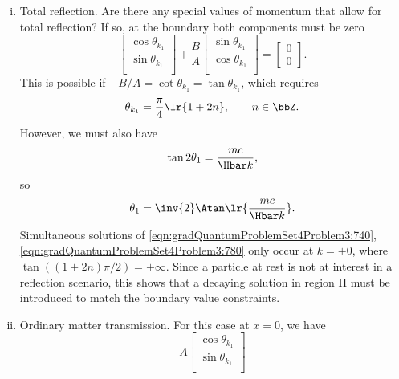 \begin{enumerate}[(i)]
\item Total reflection.  Are there any special values of momentum that allow for total reflection?  If so, at the boundary both components must be zero
%
\begin{equation}\label{eqn:gradQuantumProblemSet4Problem3:720}
\begin{bmatrix}
\cos\theta_{k_1} \\
\sin\theta_{k_1} \\
\end{bmatrix}
+
\frac{B}{A}
\begin{bmatrix}
\sin\theta_{k_1} \\
\cos\theta_{k_1} \\
\end{bmatrix}
=
\begin{bmatrix}
0 \\
0
\end{bmatrix}.
\end{equation}
This is possible if \( -B/A = \cot\theta_{k_1} = \tan\theta_{k_1} \), which requires
%
\begin{equation}\label{eqn:gradQuantumProblemSet4Problem3:740}
\theta_{k_1} = \frac{\pi}{4} \lr{ 1 + 2 n }, \qquad n \in \bbZ.
\end{equation}
%
However, we must also have
%
\begin{equation}\label{eqn:gradQuantumProblemSet4Problem3:760}
\tan 2 \theta_1 = \frac{m c}{\Hbar k},
\end{equation}
%
so
%
\begin{equation}\label{eqn:gradQuantumProblemSet4Problem3:780}
\theta_1 = \inv{2} \Atan\lr{ \frac{m c}{\Hbar k} }.
\end{equation}
%
Simultaneous solutions of \cref{eqn:gradQuantumProblemSet4Problem3:740}, \cref{eqn:gradQuantumProblemSet4Problem3:780} only occur at \( k = \pm 0 \), where \( \tan( (1 + 2 n)\pi/2 ) = \pm \infty \).  Since a particle at rest is not at interest in a reflection scenario, this shows that a decaying solution in region II must be introduced to match the boundary value constraints.
\item Ordinary matter transmission.
For this case at \( x = 0 \), we have
%
\begin{dmath}\label{eqn:gradQuantumProblemSet4Problem3:920}
A
\begin{bmatrix}
\cos\theta_{k_1} \\
\sin\theta_{k_1} \\
\end{bmatrix}

\end{dmath}
\end{enumerate}
